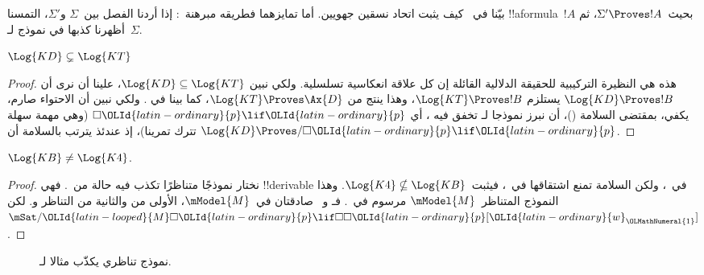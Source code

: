\documentclass[../../../include/open-logic-section]{subfiles}
\begin{document}


بيّنا في~ كيف يثبت اتحاد نسقين جهويين.
أما تمايزهما فطريقه مبرهنة~:
إذا أردنا الفصل بين~$\Sigma$ و$\Sigma'$، التمسنا !!a{formula}~$!A$
بحيث~$\Sigma' \Proves !A$، ثم أظهرنا كذبها في نموذج لـ~$\Sigma$.

\begin{prop}
  $\Log{KD} \subsetneq \Log{KT}$
\end{prop}

\begin{proof} هذه هي النظيرة التركيبية للحقيقة الدلالية القائلة إن كل
  علاقة انعكاسية تسلسلية. ولكي نبين $\Log{KD} \subseteq \Log{KT}$،
  علينا أن نرى أن $\Log{KD} \Proves !B$ يستلزم $\Log{KT} \Proves
  !B$، وهذا ينتج من $\Log{KT} \Proves \Ax{D}$، كما بينا في
  . ولكي نبين
  أن الاحتواء صارم، يكفي، بمقتضى السلامة
  ()، أن نبرز نموذجا لـ تخفق فيه
  ، أي $\Box \OLId{latin-ordinary}{p} \lif \OLId{latin-ordinary}{p}$ (وهي مهمة سهلة تترك تمرينا)، إذ عندئذ
  يترتب بالسلامة أن $\Log{KD} \Proves/ \Box \OLId{latin-ordinary}{p} \lif \OLId{latin-ordinary}{p}$.
\end{proof}

\begin{prop}
  $\Log{KB} \neq \Log{K4}$.
\end{prop}

\begin{proof}
  نختار نموذجًا متناظرًا تكذب فيه حالة من~. فهي
  !!{derivable} في~، ولكن السلامة تمنع اشتقاقها
  في~، فيثبت~$\Log{K4} \nsubseteq \Log{KB}$.
  وهذا النموذج المتناظر~$\mModel{M}$ مرسوم في~.
  فـ و~ صادقتان في~$\mModel{M}$، الأولى من
   والثانية من التناظر
  و.
  لكن~$\mSat/{\OLId{latin-looped}{M}}{\Box \OLId{latin-ordinary}{p} \lif \Box\Box \OLId{latin-ordinary}{p}}[\OLId{latin-ordinary}{w}_\OLMathNumeral{1}]$.
\end{proof}

\begin{figure}[htpb]
  \centering
  \caption{نموذج تناظري يكذّب مثالا لـ.}
\end{figure}
 
\end{document}
